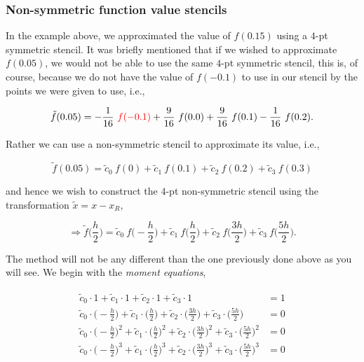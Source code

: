 \documentclass[paper=a4, fontsize=11pt]{scrartcl} %
\numberwithin{equation}{section} %
\numberwithin{figure}{section} %
\numberwithin{table}{section} %
\begin{document}
\subsubsection{Non-symmetric function value stencils}

$ $\\

In the example above, we approximated the value of $f(0.15)$ using a $4$-pt symmetric stencil. It was briefly mentioned that if we wished to approximate $f(0.05)$, we would not be able to use the same $4$-pt symmetric stencil, this is, of course, because we do not have the value of $f(-0.1)$ to use in our stencil by the points we were given to use, i.e.,

$$\tilde{f}(0.05) = -\frac{1}{16}\ {\textcolor{red}{f(-0.1)}} + \frac{9}{16}\ f(0.0) + \frac{9}{16}\ f(0.1) -\frac{1}{16}\ f(0.2).$$

Rather we can use a non-symmetric stencil to approximate its value, i.e.,

$$\tilde{f}(0.05) = \tilde{c}_0\ f(0) + \tilde{c}_1\ f(0.1) + \tilde{c}_2\ f(0.2) + \tilde{c}_3\ f(0.3)$$

and hence we wish to construct the $4$-pt non-symmetric stencil using the transformation $\tilde{x}=x-x_R$,

$$\Rightarrow \tilde{f}\Big(\frac{h}{2}\Big) =  \tilde{c}_0\ f\Big(-\frac{h}{2}\Big)  + \tilde{c}_1\ f\Big(\frac{h}{2}\Big)  + \tilde{c}_2\ f\Big(\frac{3h}{2}\Big)  + \tilde{c}_3\ f\Big(\frac{5h}{2}\Big).$$

The method will not be any different than the one previously done above as you will see. We begin with the \emph{moment equations},

\begin{align}
\nonumber
\begin{split}
\tilde{c}_0\cdot 1                                  + \tilde{c}_1\cdot 1                                 + \tilde{c}_2\cdot 1                                    + \tilde{c}_3\cdot 1 &= 1 \\
\tilde{c}_0\cdot \Big(-\frac{h}{2}\Big)    + \tilde{c}_1\cdot \Big(\frac{h}{2}\Big)     + \tilde{c}_2\cdot \Big(\frac{3h}{2}\Big)     +\tilde{c}_3\cdot \Big(\frac{5h}{2}\Big) &= 0  \\
\tilde{c}_0\cdot \Big(-\frac{h}{2}\Big)^2 + \tilde{c}_1\cdot \Big(\frac{h}{2}\Big)^2 + \tilde{c}_2\cdot \Big(\frac{3h}{2}\Big)^2 + \tilde{c}_3\cdot \Big(\frac{5h}{2}\Big)^2 &= 0  \\
\tilde{c}_0\cdot \Big(-\frac{h}{2}\Big)^3 + \tilde{c}_1\cdot \Big(\frac{h}{2}\Big)^3 + \tilde{c}_2\cdot \Big(\frac{3h}{2}\Big)^3 + \tilde{c}_3\cdot \Big(\frac{5h}{2}\Big)^3 &= 0 \\ \\
\end{split}
\end{align}
\end{document}

